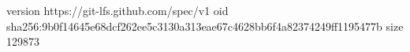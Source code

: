 version https://git-lfs.github.com/spec/v1
oid sha256:9b0f14645e68dcf262ee5c3130a313eae67c4628bb6f4a82374249ff1195477b
size 129873
